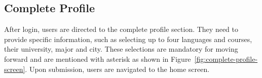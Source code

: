 \subsection{Complete Profile}
After login, users are directed to the complete profile section. They need to provide specific information, such as selecting up to four languages and courses, their university, major and city. These selections are mandatory for moving forward and are mentioned with asterisk as shown in Figure~\ref{fig:complete-profile-screen}. Upon submission, users are navigated to the home screen.
   \begin{figure}[H]
	\centering
	\hspace{5pt}

\end{figure}
